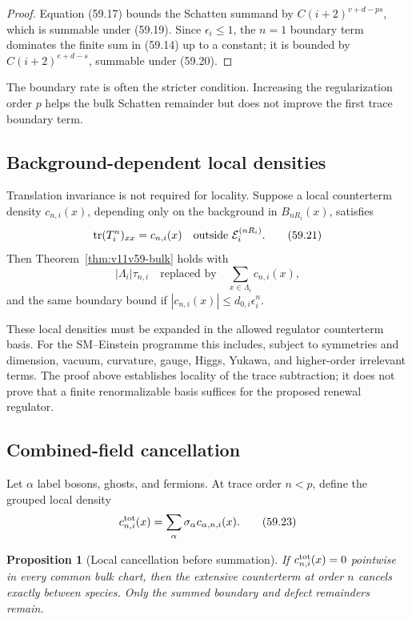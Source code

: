 \documentclass[11pt]{article}
\newtheorem{proposition}[theorem]{Proposition}
\begin{document}
\begin{proof}
Equation (59.17) bounds the Schatten summand by
\(C(i+2)^{v+d-ps}\), which is summable under (59.19).
Since \(\epsilon_i\le1\), the \(n=1\) boundary term dominates the
finite sum in (59.14) up to a constant; it is bounded by
\(C(i+2)^{e+d-s}\), summable under (59.20).
\end{proof}

The boundary rate is often the stricter condition.  Increasing the
regularization order \(p\) helps the bulk Schatten remainder but does
not improve the first trace boundary term.

\subsection{Background-dependent local densities}

Translation invariance is not required for locality.  Suppose a local
counterterm density \(c_{n,i}(x)\), depending only on the background in
\(B_{nR_i}(x)\), satisfies
\[
 \operatorname{tr}(T_i^n)_{xx}=c_{n,i}(x)
       \quad\text{outside }{\cal E}_i^{(nR_i)}.               \tag{59.21}
\]
Then Theorem~\ref{thm:v11v59-bulk} holds with
\[
                         |\Lambda_i|\tau_{n,i}
                    \quad\text{replaced by}\quad
                         \sum_{x\in\Lambda_i}c_{n,i}(x),       \tag{59.22}
\]
and the same boundary bound if
\(|c_{n,i}(x)|\le d_{0,i}\epsilon_i^n\).

These local densities must be expanded in the allowed regulator
counterterm basis.  For the SM--Einstein programme this includes,
subject to symmetries and dimension, vacuum, curvature, gauge,
Higgs, Yukawa, and higher-order irrelevant terms.  The proof above
establishes locality of the trace subtraction; it does not prove that
a finite renormalizable basis suffices for the proposed renewal
regulator.

\subsection{Combined-field cancellation}

Let \(\alpha\) label bosons, ghosts, and fermions.  At trace order
\(n<p\), define the grouped local density
\[
                         c_{n,i}^{\rm tot}(x)
                   =\sum_\alpha\sigma_\alpha
                         c_{\alpha,n,i}(x).                   \tag{59.23}
\]

\begin{proposition}[Local cancellation before summation]
\label{prop:v11v59-local-cancel}
If \(c_{n,i}^{\rm tot}(x)=0\) pointwise in every common bulk chart,
then the extensive counterterm at order \(n\) cancels exactly between
species.  Only the summed boundary and defect remainders remain.
\end{proposition}
\end{document}
